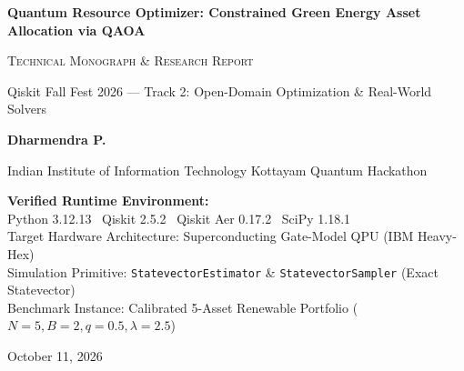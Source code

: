 \begin{titlepage}
    \centering
    \vspace*{1.5cm}
    
    {\Huge \bfseries Quantum Resource Optimizer: Constrained Green Energy Asset Allocation via QAOA\par}
    
    \vspace{1.0cm}
    {\LARGE \textsc{Technical Monograph \& Research Report}\par}
    \vspace{0.3cm}
    {\large Qiskit Fall Fest 2026 --- Track 2: Open-Domain Optimization \& Real-World Solvers\par}
    
    \vspace{2.0cm}
    
    {\Large \textbf{Dharmendra P.}\par}
    \vspace{0.4cm}
    {\large Indian Institute of Information Technology Kottayam Quantum Hackathon\par}
    
    \vfill
    
    \begin{minipage}{0.85\textwidth}
        \centering
        \small
        \textbf{Verified Runtime Environment:} \\
        Python 3.12.13 \textbar\ Qiskit 2.5.2 \textbar\ Qiskit Aer 0.17.2 \textbar\ SciPy 1.18.1 \\
        Target Hardware Architecture: Superconducting Gate-Model QPU (IBM Heavy-Hex) \\
        Simulation Primitive: \texttt{StatevectorEstimator} \& \texttt{StatevectorSampler} (Exact Statevector) \\
        Benchmark Instance: Calibrated 5-Asset Renewable Portfolio ($N=5, B=2, q=0.5, \lambda=2.5$)
    \end{minipage}
    
    \vspace{1.5cm}
    
    {\large October 11, 2026\par}
\end{titlepage}

